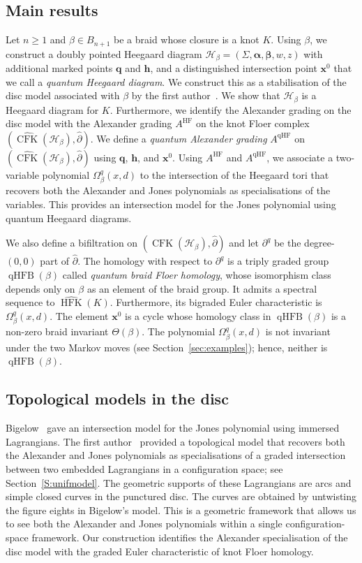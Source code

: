 \documentclass[11pt]{amsart}
\numberwithin{equation}{section}
\numberwithin{figure}{section}
\theoremstyle{definition}
\newcommand{\cH}{\mathcal{H}}
\newcommand{\ph}{\widehat{\partial}}
\DeclareMathOperator{\qHF}{qHF}
\DeclareMathOperator{\qHFB}{qHFB}
\DeclareMathOperator{\CFK}{CFK}
\newcommand{\CFKh}{\widehat{\CFK}}
\DeclareMathOperator{\HF}{HF}
\DeclareMathOperator{\HFK}{HFK}
\newcommand{\HFKh}{\widehat{\HFK}}
\newcommand{\as}{\boldsymbol{\alpha}}
\newcommand{\bs}{\boldsymbol{\beta}}
\newcommand{\hs}{\boldsymbol{h}}
\newcommand{\qs}{\boldsymbol{q}}
\newcommand{\xs}{\boldsymbol{x}}
\begin{document}
\subsection{Main results} Let $n \ge 1$ and $\beta \in B_{n+1}$ be a braid whose closure is a knot $K$. Using $\beta$, we construct a doubly pointed Heegaard diagram $\cH_\beta = (\Sigma, \as, \bs, w, z)$ with additional marked points $\qs$ and $\hs$, and a distinguished intersection point $\xs^0$ that we call a \emph{quantum Heegaard diagram}. We construct this as a stabilisation of the disc model associated with $\beta$ by the first author~\cite{Anghel2023TAMS, Anghel2024AIF}. We show that $\cH_\beta$ is a Heegaard diagram for $K$. Furthermore, we identify the Alexander grading on the disc model with the Alexander grading $A^{\HF}$ on the knot Floer complex $(\CFKh(\cH_\beta), \ph)$. We define a \emph{quantum Alexander grading} $A^{\qHF}$ on $(\CFKh(\cH_\beta), \ph)$ using $\qs$, $\hs$, and $\xs^0$. Using $A^{\HF}$ and $A^{\qHF}$, we associate a two-variable polynomial $\Omega^q_\beta(x,d)$ to the intersection of the Heegaard tori that recovers both the Alexander and Jones polynomials as specialisations of the variables. This provides an intersection model for the Jones polynomial using quantum Heegaard diagrams.

We also define a bifiltration on $(\CFKh(\cH_\beta), \ph)$ and let $\partial^q$ be the degree-$(0,0)$ part of $\ph$. The homology with respect to $\partial^q$ is a triply graded group $\qHFB(\beta)$ called \emph{quantum braid Floer homology}, whose isomorphism class depends only on $\beta$ as an element of the braid group. It admits a spectral sequence to $\HFKh(K)$. Furthermore, its bigraded Euler characteristic is $\Omega^q_\beta(x,d)$. The element $\xs^0$ is a cycle whose homology class in $\qHFB(\beta)$ is a non-zero braid invariant $\Theta(\beta)$. The polynomial $\Omega^q_\beta(x,d)$ is not invariant under the two Markov moves (see Section~\ref{sec:examples}); hence, neither is $\qHFB(\beta)$.

\subsection{Topological models in the disc} Bigelow~\cite{Bigelow2002} gave an intersection model for the Jones polynomial using immersed Lagrangians. The first author~\cite{Anghel2023TAMS, Anghel2024AIF} provided a topological model that recovers both the Alexander and Jones polynomials as specialisations of a graded intersection between two embedded Lagrangians in a configuration space; see Section~\ref{S:unifmodel}. The geometric supports of these Lagrangians are arcs and simple closed curves in the punctured disc. The curves are obtained by untwisting the figure eights in Bigelow's model. This is a geometric framework that allows us to see both the Alexander and Jones polynomials within a single configuration-space framework. Our construction identifies the Alexander specialisation of the disc model with the graded Euler characteristic of knot Floer homology.
 
\end{document}
